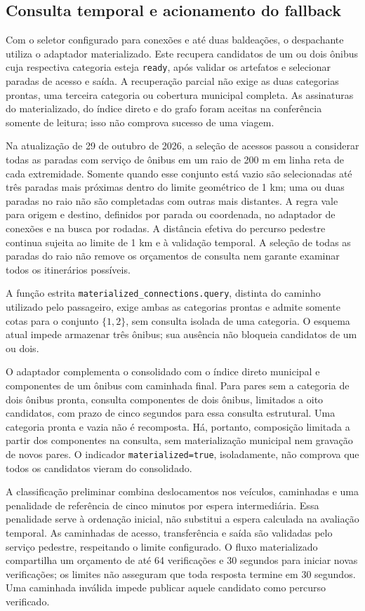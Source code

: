 \subsection{Consulta temporal e acionamento do fallback}
Com o seletor configurado para conexões e até duas baldeações, o despachante utiliza o adaptador materializado. Este recupera candidatos de um ou dois ônibus cuja respectiva categoria esteja \texttt{ready}, após validar os artefatos e selecionar paradas de acesso e saída. A recuperação parcial não exige as duas categorias prontas, uma terceira categoria ou cobertura municipal completa. As assinaturas do materializado, do índice direto e do grafo foram aceitas na conferência somente de leitura; isso não comprova sucesso de uma viagem.

Na atualização de 29 de outubro de 2026, a seleção de acessos passou a considerar todas as paradas com serviço de ônibus em um raio de 200 m em linha reta de cada extremidade. Somente quando esse conjunto está vazio são selecionadas até três paradas mais próximas dentro do limite geométrico de 1 km; uma ou duas paradas no raio não são completadas com outras mais distantes. A regra vale para origem e destino, definidos por parada ou coordenada, no adaptador de conexões e na busca por rodadas. A distância efetiva do percurso pedestre continua sujeita ao limite de 1 km e à validação temporal. A seleção de todas as paradas do raio não remove os orçamentos de consulta nem garante examinar todos os itinerários possíveis.

A função estrita \nolinkurl{materialized_connections.query}, distinta do caminho utilizado pelo passageiro, exige ambas as categorias prontas e admite somente cotas para o conjunto $\{1,2\}$, sem consulta isolada de uma categoria. O esquema atual impede armazenar três ônibus; sua ausência não bloqueia candidatos de um ou dois.

O adaptador complementa o consolidado com o índice direto municipal e componentes de um ônibus com caminhada final. Para pares sem a categoria de dois ônibus pronta, consulta componentes de dois ônibus, limitados a oito candidatos, com prazo de cinco segundos para essa consulta estrutural. Uma categoria pronta e vazia não é recomposta. Há, portanto, composição limitada a partir dos componentes na consulta, sem materialização municipal nem gravação de novos pares. O indicador \texttt{materialized=true}, isoladamente, não comprova que todos os candidatos vieram do consolidado.

A classificação preliminar combina deslocamentos nos veículos, caminhadas e uma penalidade de referência de cinco minutos por espera intermediária. Essa penalidade serve à ordenação inicial, não substitui a espera calculada na avaliação temporal. As caminhadas de acesso, transferência e saída são validadas pelo serviço pedestre, respeitando o limite configurado. O fluxo materializado compartilha um orçamento de até 64 verificações e 30 segundos para iniciar novas verificações; os limites não asseguram que toda resposta termine em 30 segundos. Uma caminhada inválida impede publicar aquele candidato como percurso verificado.

